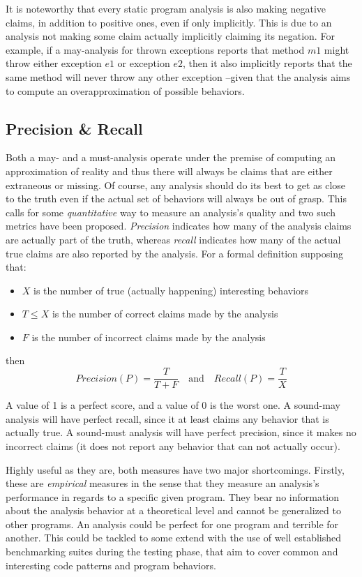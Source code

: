 It is noteworthy that every static program analysis is also making negative
claims, in addition to positive ones, even if only implicitly. This is due to
an analysis not making some claim actually implicitly claiming its negation.
For example, if a may-analysis for thrown exceptions reports that method $m1$
might throw either exception $e1$ or exception $e2$, then it also implicitly
reports that the same method will never throw any other exception --given that
the analysis aims to compute an overapproximation of possible behaviors.

\subsection{Precision \& Recall}

Both a may- and a must-analysis operate under the premise of computing an
approximation of reality and thus there will always be claims that are either
extraneous or missing. Of course, any analysis should do its best to get as
close to the truth even if the actual set of behaviors will always be out of
grasp. This calls for some \emph{quantitative} way to measure an analysis's
quality and two such metrics have been proposed. \emph{Precision} indicates how
many of the analysis claims are actually part of the truth, whereas
\emph{recall} indicates how many of the actual true claims are also reported by
the analysis. For a formal definition supposing that:
\begin{itemize}
    \item $X$ is the number of true (actually happening) interesting behaviors
    \item $T \leq X$ is the number of correct claims made by the analysis
    \item $F$ is the number of incorrect claims made by the analysis
\end{itemize}
then
\[
Precision(P) = \frac{T}{T + F}
\quad \textrm{and} \quad
Recall(P) = \frac{T}{X}
\]

A value of 1 is a perfect score, and a value of 0 is the worst one. A sound-may
analysis will have perfect recall, since it at least claims any behavior that
is actually true. A sound-must analysis will have perfect precision, since it
makes no incorrect claims (it does not report any behavior that can not
actually occur).

Highly useful as they are, both measures have two major shortcomings. Firstly,
these are \emph{empirical} measures in the sense that they measure an
analysis's performance in regards to a specific given program. They bear no
information about the analysis behavior at a theoretical level and cannot be
generalized to other programs. An analysis could be perfect for one program and
terrible for another. This could be tackled to some extend with the use of well
established benchmarking suites during the testing phase, that aim to cover
common and interesting code patterns and program behaviors.


